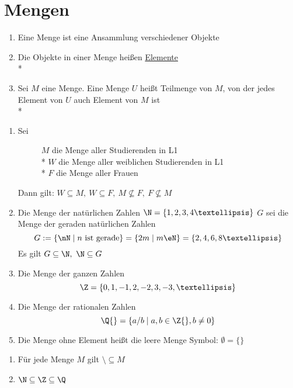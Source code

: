 
\chapter{Mengen}
\begin{enumerate}
\item{Eine Menge ist eine Ansammlung verschiedener Objekte}
\item{Die Objekte in einer Menge heißen \ul{Elemente}\\*
%
}
%
\item{Sei $M$ eine Menge. Eine Menge $U$ heißt Teilmenge von $M$, von der jedes Element von $U$ auch Element von $M$ ist\\*
%
}
\end{enumerate}

\begin{enumerate}
\item{\begin{description}
\item[Sei]{$M$ die Menge aller Studierenden in L1\\*
$W$  die Menge aller weiblichen Studierenden in L1\\*
$F$ die Menge aller Frauen}
\end{description}
Dann gilt: $W \subseteq M,\ W \subseteq F,\ M \not\subseteq F,\ F\not\subseteq M$}
\item {Die Menge der natürlichen Zahlen
$\N = \{1,2,3,4 …\}$
$G$ sei die Menge der geraden natürlichen Zahlen
$$G := \{\nN \mid n\text{ ist gerade}\} = \{2m \mid m \eN\} = \{2,4,6,8 …\}$$
Es gilt $G \subseteq \N,\ \N \subseteq G$}
\item {Die Menge der ganzen Zahlen
$$\Z = \{0,1,-1,2,-2,3,-3, …\}$$}
\item {Die Menge der rationalen Zahlen
$$\Q{} = \{a/b\mid a, b \in \Z{}, b \neq 0\}$$}
\item {Die Menge ohne Element heißt die leere Menge
Symbol: $\emptyset = \{\}$}
\end{enumerate}
%
\bem
\begin{enumerate}
\item Für jede Menge $M$ gilt $\setminus \subseteq M$
\item $\N \subseteq \Z \subseteq \Q$
\end{enumerate}

